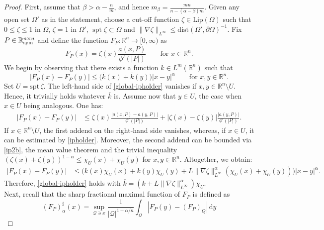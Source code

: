 \documentclass[leqno,11pt]{amsart}%
\numberwithin{equation}{section}
\def\real{\mathbb R}
\def\R{\mathbb R}
\def\Rn{{\mathbb R}^{n}}
\def\d{\mathrm{d}}
\def\Sym{\real^{n\times n}_{\textup{sym}}}
\DeclareMathOperator\spt{spt}
\theoremstyle{definition}
\numberwithin{equation}{section}
\begin{document}
\begin{proof}
  First, assume that $\beta>\alpha -\frac{n}{
  m} $, and hence ${m}_\beta =\frac{ m
  n}{n-(\alpha-\beta) m}$.
    Given any open set 
  $\Omega'$ as in the statement,  choose a cut-off function
  $\zeta\in \mathrm{Lip}(\Omega)$ such that $0\leq \zeta \leq 1$ in $\Omega$,    $\zeta= 1$ in
  $\Omega'$, $\spt\zeta \subset\Omega$ and $\|\nabla\zeta\|_{L^\infty}\le \mathrm{dist}(\Omega',\partial\Omega)^{-1}$. Fix $P\in\Sym$ and define the function
  $F_P : \Rn \to [0, \infty)$ as
  \begin{equation*}
    F_P(x) = \zeta(x)\frac{a(x,P)}{\phi'(|P|)}
    \qquad\mbox{for }x\in\R^n.
  \end{equation*}
  We begin by observing that there exists a function  $\overline k\in L^{ m}(\R^n)$
such that
\begin{equation}\label{global-ipholder}
    |F_P(x)-F_P(y)|
    \le
    \big(\overline k(x)+\overline k(y)\big)|x-y|^\alpha \qquad \textrm{for   $x,y\in\R^n$.}
  \end{equation}
 Set $U= \textrm{spt} \,\zeta$. The left-hand side of \eqref{global-ipholder} vanishes if
  $x,y\in\R^n\setminus U$. Hence, it trivially holds whatever $\overline k$ is. 
  Assume now that
  $y\in U$, the case when $x\in U$ being analogous. One has:
  \begin{align*}
    |F_P(x)-F_P(y)|
    &\le
    \zeta(x)\frac{|a(x,P)-a(y,P)|}{\phi'(|P|)}
    +
    |\zeta(x)-\zeta(y)|\frac{|a(y,P)|}{\phi'(|P|)}.
  \end{align*}
  If $x\in\R^n\setminus U$, the first addend on the right-hand side
  vanishes, whereas, if $x\in U$, it can be estimated by
  \eqref{ipholder}. Moreover, the second addend can be bounded via \eqref{ip2b}, the mean value theorem and the trivial inequality
$(\zeta(x)+\zeta(y))^{1-\alpha}\le \chi_U(x)+\chi_U(y)$ for $x, y \in \mathbb R^n$.
  Altogether, we obtain:
  \begin{align*}
    |F_P(x)-F_P(y)|
    &\le
      \Big(k(x)\chi_U(x)+k(y)\chi_U(y)+L\|\nabla\zeta\|_{L^\infty}^{\alpha}(\chi_U(x)+\chi_U(y))\Big)|x-y|^\alpha.
  \end{align*}
  Therefore, \eqref{global-ipholder} holds with $\overline
  k=(k+L\|\nabla\zeta\|_{L^\infty}^{\alpha})\chi_U$. 
\\ Next,
  recall that the  sharp fractional maximal function of $F_P$ is defined as
  \begin{equation*}
    (F_P)_\alpha^\sharp(x)=\sup_{\mathcal  Q\ni x}
    \frac{1}{|\mathcal Q|^{1+\alpha/n}}\int_\mathcal  Q |F_P(y)-(F_P)_Q|\,\d y

\end{equation*}
\end{proof}
\end{document}
